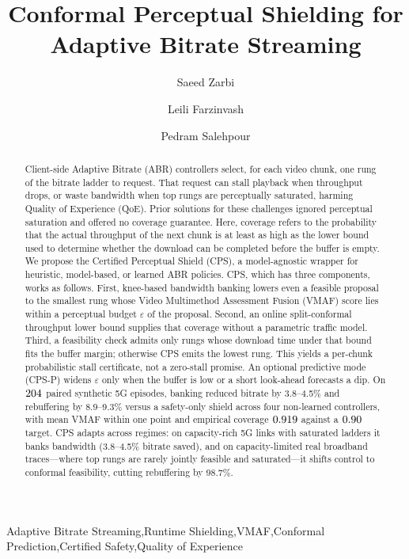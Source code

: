 \begin{frontmatter}

\title{Conformal Perceptual Shielding for Adaptive Bitrate Streaming}

\author[a]{Saeed Zarbi}
\author[a]{Leili Farzinvash}
\author[a]{Pedram Salehpour}

\address[a]{Department of Computer Engineering, Faculty of Electrical and Computer Engineering, University of Tabriz, Tabriz, Iran}

\begin{abstract}
Client-side Adaptive Bitrate (ABR) controllers select, for each video chunk, one rung of the bitrate ladder to request.
That request can stall playback when throughput drops, or waste bandwidth when top rungs are perceptually saturated, harming Quality of Experience (QoE).
Prior solutions for these challenges ignored perceptual saturation and offered no coverage guarantee.
Here, coverage refers to the probability that the actual throughput of the next chunk is at least as high as the lower bound used to determine whether the download can be completed before the buffer is empty.
We propose the Certified Perceptual Shield (CPS), a model-agnostic wrapper for heuristic, model-based, or learned ABR policies.
CPS, which has three components, works as follows.
First, knee-based bandwidth banking lowers even a feasible proposal to the smallest rung whose Video Multimethod Assessment Fusion (VMAF) score lies within a perceptual budget \(\varepsilon\) of the proposal.
Second, an online split-conformal throughput lower bound supplies that coverage without a parametric traffic model.
Third, a feasibility check admits only rungs whose download time under that bound fits the buffer margin; otherwise CPS emits the lowest rung.
This yields a per-chunk probabilistic stall certificate, not a zero-stall promise.
An optional predictive mode (CPS-P) widens \(\varepsilon\) only when the buffer is low or a short look-ahead forecasts a dip.
On \(204\) paired synthetic \mbox{5G} episodes, banking reduced bitrate by 3.8--4.5\% and rebuffering by 8.9--9.3\% versus a safety-only shield across four non-learned controllers, with mean VMAF within one point and empirical coverage \(0.919\) against a \(0.90\) target.
CPS adapts across regimes: on capacity-rich \mbox{5G} links with saturated ladders it banks bandwidth (3.8--4.5\% bitrate saved), and on capacity-limited real broadband traces---where top rungs are rarely jointly feasible and saturated---it shifts control to conformal feasibility, cutting rebuffering by 98.7\%.
\end{abstract}

\begin{keyword}
Adaptive Bitrate Streaming\sep Runtime Shielding\sep VMAF\sep Conformal Prediction\sep Certified Safety\sep Quality of Experience
\end{keyword}

\end{frontmatter}

